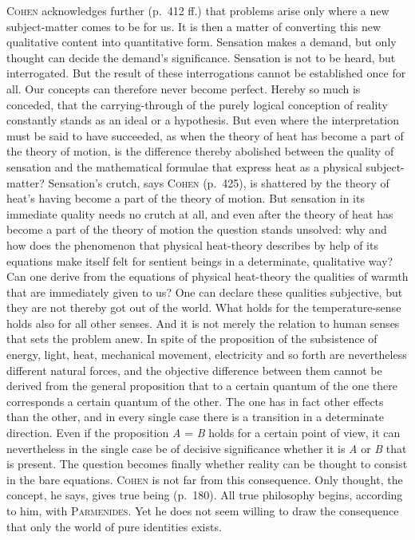 \documentclass[12pt]{book}
\newcommand{\opage}[1]{\marginnote{\footnotesize\textit{[#1]}}}
\begin{document}
\textsc{Cohen} acknowledges further (p.\ 412 ff.) that problems arise only where a
new subject-matter comes to be for us. It is then a matter of converting this new
qualitative content into quantitative form. Sensation makes a demand, but only
thought can decide the demand's significance. Sensation is not to be heard, but
interrogated. But the result of these interrogations cannot be established once for
all. Our concepts can therefore never become perfect. Hereby so much is conceded,
that the carrying-through of the purely logical conception of reality constantly
stands as an ideal or a hypothesis. But even where the interpretation must be said
to have succeeded, as when the theory of heat has become a part of the theory of
motion, is the difference thereby abolished between the quality of sensation and
the mathematical formulae that express heat as a physical subject-matter?
Sensation's crutch, says \textsc{Cohen} (p.\ 425), is shattered by the theory of
heat's having become a part of the theory of motion. But sensation in its immediate
quality needs no crutch at all, and even after the theory of heat has become a part
of the theory of motion the question stands unsolved: why and how does the
phenomenon that physical heat-theory describes by help of its equations make itself
felt for sentient beings in a determinate, qualitative way? Can one derive from the
equations of physical heat-theory the qualities of warmth that are immediately
given to us? One can declare these qualities subjective, but they are not thereby
got out of the world. What holds for the temperature-sense holds also for all other
senses. And it is not merely the relation to human senses that sets the problem
anew. In spite of the proposition of the subsistence of energy, light, heat,
mechanical movement, electricity and so forth are nevertheless different natural
forces, and the objective difference between them cannot be derived from the general
proposition that to a certain quantum of the one there corresponds a certain quantum
of the other. The one has in fact other effects than the other, and in every single
case there is a transition in a determinate direction. Even if the proposition
\textit{A} = \textit{B} holds for a certain point of view, it can nevertheless in
the single case be of decisive significance whether it is \textit{A} or \textit{B}
\opage{48}that is present. The question becomes finally whether reality can be thought to
consist in the bare equations. \textsc{Cohen} is not far from this consequence.
Only thought, the concept, he says, gives true being (p.\ 180). All true philosophy
begins, according to him, with \textsc{Parmenides}. Yet he does not seem willing to
draw the consequence that only the world of pure identities exists.
\end{document}
